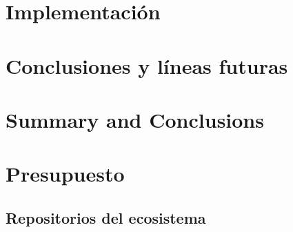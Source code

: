 \documentclass[spanish,a4paper,12pt,oneside]{extreport}
\begin{document}


\newpage{\pagestyle{empty}}
\thispagestyle{empty}

\chapter{\LARGE Implementación}
\label{chapter:cuatro}



\newpage{\pagestyle{empty}}
\thispagestyle{empty}

\chapter{\LARGE Conclusiones y líneas futuras}
\label{chapter:Resultados}



\newpage{\pagestyle{empty}}
\thispagestyle{empty}

\chapter{\LARGE Summary and Conclusions}
\label{chapter:Conclusiones}



\newpage{\pagestyle{empty}}
\thispagestyle{empty}

\chapter{\LARGE Presupuesto}
\label{chapter:presupuesto}



\newpage{\pagestyle{empty}\cleardoublepage}
\thispagestyle{empty}

\begin{appendix}

\chapter{\LARGE Repositorios del ecosistema}
\label{appendix:1}


\end{appendix}
\printglossary[title=Glosario, toctitle=Glosario]

%


 
%
\end{document}
